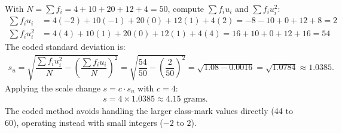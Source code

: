 \begin{solproblema}[prob:78de91c]
	With $N=\sum f_i = 4+10+20+12+4=50$, compute $\sum f_iu_i$ and $\sum f_iu_i^2$:
	\begin{align}
		\sum f_iu_i &= 4(-2)+10(-1)+20(0)+12(1)+4(2) = -8-10+0+12+8 = 2 \\
		\sum f_iu_i^2 &= 4(4)+10(1)+20(0)+12(1)+4(4) = 16+10+0+12+16 = 54
	\end{align}
	The coded standard deviation is:
	\begin{align}
		s_u = \sqrt{\dfrac{\sum f_iu_i^2}{N} - \left(\dfrac{\sum f_iu_i}{N}\right)^2} = \sqrt{\dfrac{54}{50} - \left(\dfrac{2}{50}\right)^2} = \sqrt{1.08 - 0.0016} = \sqrt{1.0784} \approx 1.0385.
	\end{align}
	Applying the scale change $s = c \cdot s_u$ with $c=4$:
	\begin{align}
		s = 4 \times 1.0385 \approx 4.15 \text{ grams.}
	\end{align}
	The coded method avoids handling the larger class-mark values directly (44 to 60), operating instead with small integers ($-2$ to $2$).
\end{solproblema}
